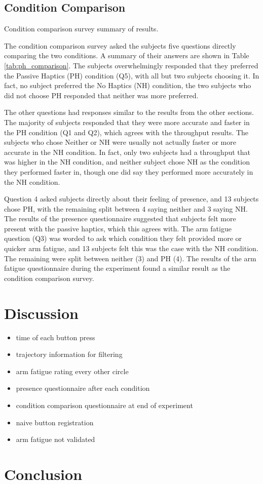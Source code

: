 \subsection{Condition Comparison}

\begin{table}
    \centering
    \caption{Condition comparison survey summary of results.}
    \label{tab:ph_comparison}
\end{table}

The condition comparison survey asked the subjects five questions directly comparing the two conditions.
A summary of their answers are shown in Table \ref{tab:ph_comparison}.
The subjects overwhelmingly responded that they preferred the Passive Haptics (PH) condition (Q5), with all but two subjects choosing it.
In fact, no subject preferred the No Haptics (NH) condition, the two subjects who did not choose PH responded that neither was more preferred.

The other questions had responses similar to the results from the other sections.
The majority of subjects responded that they were more accurate and faster in the PH condition (Q1 and Q2), which agrees with the throughput results.
The subjects who chose Neither or NH were usually not actually faster or more accurate in the NH condition.
In fact, only two subjects had a throughput that was higher in the NH condition, and neither subject chose NH as the condition they performed faster in, though one did say they performed more accurately in the NH condition.

Question 4 asked subjects directly about their feeling of presence, and 13 subjects chose PH, with the remaining split between 4 saying neither and 3 saying NH.
The results of the presence questionnaire suggested that subjects felt more present with the passive haptics, which this agrees with.
The arm fatigue question (Q3) was worded to ask which condition they felt provided more or quicker arm fatigue, and 13 subjects felt this was the case with the NH condition.
The remaining were split between neither (3) and PH (4).
The results of the arm fatigue questionnaire during the experiment found a similar result as the condition comparison survey.

\section{Discussion}

\begin{itemize}
  \item time of each button press
  \item trajectory information for filtering
  \item arm fatigue rating every other circle
  \item presence questionnaire after each condition
  \item condition comparison questionnaire at end of experiment
  \item naive button registration
  \item arm fatigue not validated
\end{itemize}

\section{Conclusion}

